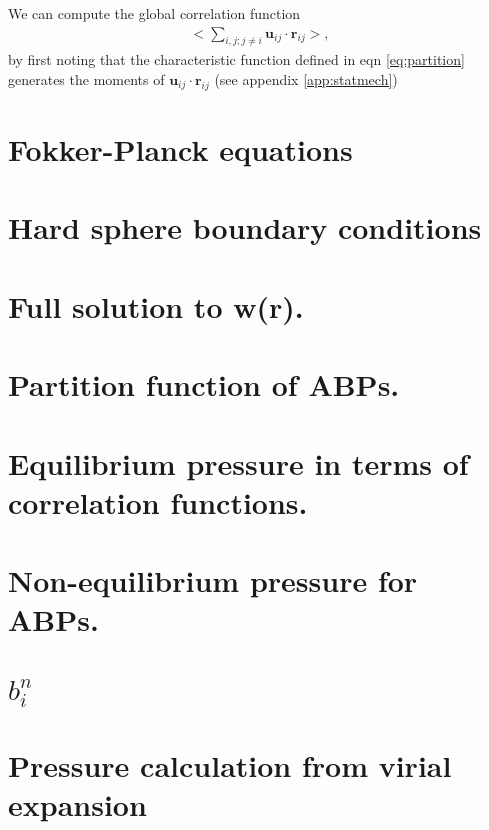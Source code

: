 \documentclass[twocolumn,amsmath,amssymb,aps]{revtex4-1}%
\begin{document}
We can compute the global correlation function
\begin{align}
  \bigg<\sum_{i,j;j\neq i} \bm{u}_{ij}\cdot\bm{r}_{ij}
  \bigg>,
\end{align}
by first noting that the characteristic function defined in eqn
\ref{eq:partition} generates the moments of
$\bm{u}_{ij}\cdot\bm{r}_{ij}$ (see appendix \ref{app:statmech})



\appendix

\section{Fokker-Planck equations\label{app:fokkerplanck}}


\section{Hard sphere boundary conditions \label{app:hardsphereBC}}


     
\section{Full solution to w(r). \label{app:fullWsolution}}



\section{Partition function of ABPs. \label{app:statmech}}



\section{Equilibrium pressure in terms of correlation
 functions.\label{app:pressure}}



\section{Non-equilibrium pressure for ABPs.}



\section{$b_i^n$}


\section{Pressure calculation from virial expansion}






\end{document}
